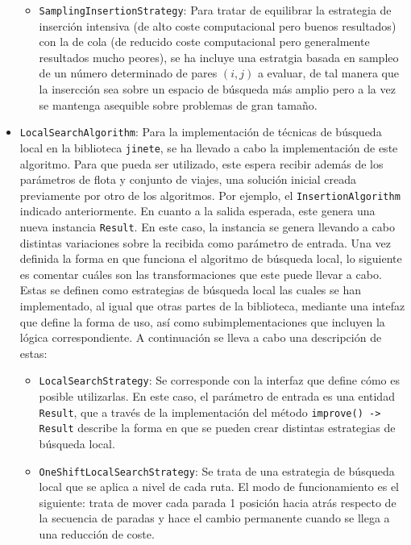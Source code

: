 \documentclass{subfiles}
\begin{document}
\begin{itemize}
\begin{itemize}
                      \item \texttt{SamplingInsertionStrategy}: Para tratar de equilibrar la estrategia de inserción intensiva (de alto coste computacional pero buenos resultados) con la de cola (de reducido coste computacional pero generalmente resultados mucho peores), se ha incluye una estratgia basada en sampleo de un número determinado de pares $(i, j)$ a evaluar, de tal manera que la insercción sea sobre un espacio de búsqueda más amplio pero a la vez se mantenga asequible sobre problemas de gran tamaño.

                  \end{itemize}

              \item \texttt{LocalSearchAlgorithm}: Para la implementación de técnicas de búsqueda local en la biblioteca \texttt{jinete}, se ha llevado a cabo la implementación de este algoritmo. Para que pueda ser utilizado, este espera recibir además de los parámetros de flota y conjunto de viajes, una solución inicial creada previamente por otro de los algoritmos. Por ejemplo, el \texttt{InsertionAlgorithm} indicado anteriormente. En cuanto a la salida esperada, este genera una nueva instancia \texttt{Result}. En este caso, la instancia se genera llevando a cabo distintas variaciones sobre la recibida como parámetro de entrada. Una vez definida la forma en que funciona el algoritmo de búsqueda local, lo siguiente es comentar cuáles son las transformaciones que este puede llevar a cabo. Estas se definen como estrategias de búsqueda local las cuales se han implementado, al igual que otras partes de la biblioteca, mediante una intefaz que define la forma de uso, así como subimplementaciones que incluyen la lógica correspondiente. A continuación se lleva a cabo una descripción de estas:

                  \begin{itemize}

                      \item \texttt{LocalSearchStrategy}: Se corresponde con la interfaz que define cómo es posible utilizarlas. En este caso, el parámetro de entrada es una entidad \texttt{Result}, que a través de la implementación del método \verb|improve() -> Result| describe la forma en que se pueden crear distintas estrategias de búsqueda local.

                      \item \texttt{OneShiftLocalSearchStrategy}: Se trata de una estrategia de búsqueda local que se aplica a nivel de cada ruta. El modo de funcionamiento es el siguiente: trata de mover cada parada 1 posición hacia atrás respecto de la secuencia de paradas y hace el cambio permanente cuando se llega a una reducción de coste.


\end{itemize}
\end{itemize}
\end{document}
